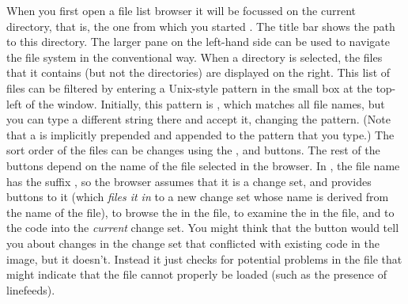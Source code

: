 \documentclass[a4paper,10pt,twoside]{book}
\begin{document}
When you first open a file list browser it will be focussed on the current directory, that is, the one from which you started \pharo. The title bar shows the path to this directory.
The larger pane on the left-hand side can be used to navigate the file system in the conventional way.
When a directory is selected, the files that it contains (but not the directories) are displayed on the right.
This list of files can be filtered by entering a Unix-style pattern in the small box at the top-left of the window.  
Initially, this pattern is \ct{*}, which matches all file names, but you can type a different string there and accept it, changing the pattern.  (Note that a \ct{*} is implicitly prepended and appended to the pattern that you type.)
The sort order of the files can be changes using the ,  and  buttons.
The rest of the buttons depend on the name of the file selected in the browser.
In , the file name has the suffix , so the browser assumes that it is a change set, and provides buttons to  it (which \textit{files it in} to a new change set whose name is derived from the name of the file),  to browse the  in the file, to examine the  in the file, 
and to  the code into the \emph{current} change set.
You might think that the  button would tell you about changes in the change set that conflicted with existing code in the image, but it doesn't.
Instead it just checks for potential problems in the file that might indicate that the file cannot properly be loaded (such as the presence of linefeeds).
\end{document}
